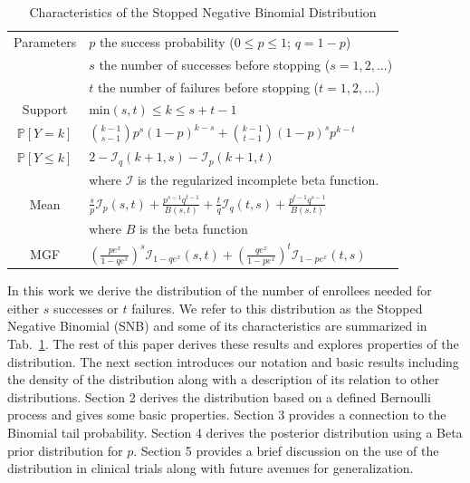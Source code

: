 \documentclass[review]{elsarticle}
\begin{document}
\begin{table}[t!]
\caption{Characteristics of the Stopped Negative Binomial Distribution}
\label{tab:snb}
\begin{center}
\begin{tabular}{|c|l|} \hline
Parameters & $p$ the success probability ($0\leq p \leq 1$; $q = 1-p$) \\
           & $s$ the number of successes before stopping ($s=1, 2, ...$)\\
           & $t$ the number of failures before stopping ($t=1, 2, ...$)\\ \hline
Support & min$(s,t) \leq k \leq s+t-1$  \\ \hline
$\mathbb{P}[Y=k]$ & ${k-1 \choose s-1} p^s (1-p)^{k-s} + {k-1 \choose t-1} (1-p)^s p^{k-t}$\\ \hline
$\mathbb{P}[Y \leq k]$ & $2 - \mathcal{I}_{q}(k+1, s) - \mathcal{I}_{p}(k+1, t)$\\ 
    & where $\mathcal{I}$ is the regularized incomplete beta function.\\ \hline
Mean & $\frac{s}{p} \mathcal{I}_p(s,t) + \frac{p^{s-1} q^{t-1}}{B(s,t)} +
  \frac{t}{q} \mathcal{I}_q(t,s) + \frac{p^{t-1} q^{s-1}}{B(s,t)}$\\ 
  & where $B$ is the beta function \\ \hline
MGF & $\left(\frac{p e^x}{1 - qe^x}\right)^s 
  \mathcal{I}_{1-qe^x} (s, t) + \left(\frac{qe^x}{1-pe^x}\right)^t 
  \mathcal{I}_{1-pe^x}(t, s) $\\ \hline
\end{tabular}
\end{center}
\end{table}

In this work we derive the distribution of the number of enrollees needed
for either $s$ successes or $t$ failures. We refer to this distribution
as the Stopped Negative Binomial (SNB) and some of its characteristics are
summarized in Tab.~\ref{tab:snb}.
The rest of this paper derives these results
and explores properties of the distribution.
The next section introduces our notation and basic results
including the density of the distribution along with a description of
its relation to other distributions. Section 2 derives the distribution
based on a defined Bernoulli process and gives some basic properties.
Section 3 provides a connection to the Binomial tail probability.
Section 4 derives the posterior distribution using a Beta prior distribution
for $p$. Section 5 provides a brief discussion on the use of the distribution
in clinical trials along with future avenues for generalization.
\end{document}
